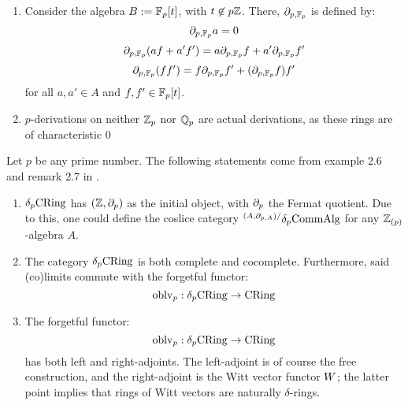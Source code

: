             \begin{example} \label{example: p_derivations_and_derivations}
                \noindent
                \begin{enumerate}
                    \item Consider the algebra $B := \mathbb{F}_p[t]$, with $t \not \in p\mathbb{Z}$. There, $\partial_{p, \mathbb{F}_p}$ is defined by:
                        $$\partial_{p, \mathbb{F}_p}a = 0$$
                        $$\partial_{p, \mathbb{F}_p}(af + a'f') = a\partial_{p, \mathbb{F}_p}f + a'\partial_{p, \mathbb{F}_p}f'$$
                        $$\partial_{p, \mathbb{F}_p}(ff') = f\partial_{p, \mathbb{F}_p}f' + (\partial_{p, \mathbb{F}_p}f) f'$$
                    for all $a, a' \in A$ and $f, f' \in \mathbb{F}_p[t]$.
                    \item $p$-derivations on neither $\mathbb{Z}_p$ nor $\mathbb{Q}_p$ are actual derivations, as these rings are of characteristic $0$ 
                \end{enumerate}
            \end{example}
             
            \begin{proposition} \label{prop: (co)limits_of_delta_rings}
                Let $p$ be any prime number. The following statements come from example 2.6 and remark 2.7 in \cite{bhatt_scholze_prisms}.
                \begin{enumerate}
                    \item $\delta_p\mathrm{CRing}$ has $(\mathbb{Z}, \partial_p)$ as the initial object, with $\partial_p$ the Fermat quotient. Due to this, one could define the coslice category ${}^{(A, \partial_{p,A})/}\delta_p\mathrm{Comm}\mathrm{Alg}$ for any $\mathbb{Z}_{(p)}$-algebra $A$. 
                    \item The category $\delta_p\mathrm{CRing}$ is both complete and cocomplete. Furthermore, said (co)limits commute with the forgetful functor:
                        $$\mathrm{oblv}_p: \delta_p\mathrm{CRing} \to \mathrm{CRing}$$
                    \item The forgetful functor:
                        $$\mathrm{oblv}_p: \delta_p\mathrm{CRing} \to \mathrm{CRing}$$
                    has both left and right-adjoints. The left-adjoint is of course the free construction, and the right-adjoint is the Witt vector functor $W$; the latter point implies that rings of Witt vectors are naturally $\delta$-rings.
                \end{enumerate}
            \end{proposition}


